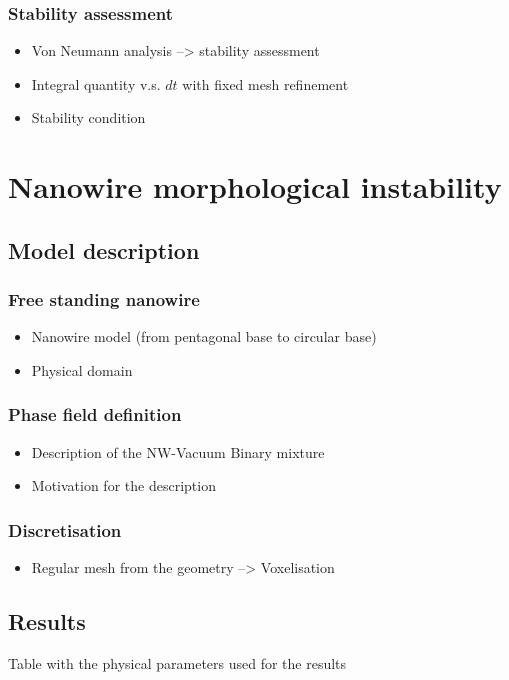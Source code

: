         \subsubsection{Stability assessment}
        \begin{itemize}
            \item Von Neumann analysis --> stability assessment
            \item Integral quantity v.s. $dt$ with fixed mesh refinement
            \item Stability condition
        \end{itemize}
\section{Nanowire morphological instability}
    \subsection{Model description}
        \subsubsection{Free standing nanowire}
        \begin{itemize}
            \item Nanowire model (from pentagonal base to circular base)
            \item Physical domain
        \end{itemize}
        \subsubsection{Phase field definition}
        \begin{itemize}
            \item Description of the NW-Vacuum Binary mixture
            \item Motivation for the description
        \end{itemize}
        \subsubsection{Discretisation}
        \begin{itemize}
            \item Regular mesh from the geometry --> Voxelisation
        \end{itemize}
    \subsection{Results}
        Table with the physical parameters used for the results
